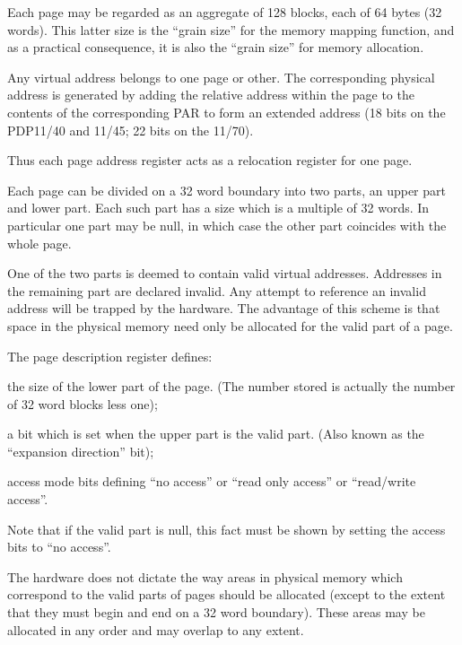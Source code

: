 Each page may be regarded as an aggregate
of 128 blocks, each of 64 bytes
(32 words). This latter size is the
``grain size'' for the memory mapping
function, and as a practical consequence,
it is also the ``grain size'' for
memory allocation.

Any virtual address belongs to one page
or other. The corresponding physical
address is generated by adding the
relative address within the page to the
contents of the corresponding PAR to
form an extended address (18 bits on
the PDP11/40 and 11/45; 22 bits on the
11/70).

Thus each page address register acts as
a relocation register for one page.

Each page can be divided on a 32 word
boundary into two parts, an upper part
and lower part. Each such part has a
size which is a multiple of 32 words.
In particular one part may be null, in
which case the other part coincides
with the whole page.

One of the two parts is deemed to contain
valid virtual addresses. Addresses
in the remaining part are declared
invalid. Any attempt to reference an
invalid address will be trapped by the
hardware. The advantage of this scheme
is that space in the physical memory
need only be allocated for the valid
part of a page.



The page description register defines:

\bd
\item[(a)] the size of the lower part of
the page. (The number stored is
actually the number of 32 word
blocks less one);

\item[(b)] a bit which is set when the
upper part is the valid part.
(Also known as the ``expansion
direction'' bit);

\item[(c)] access mode bits defining ``no
access'' or ``read only access'' or
``read/write access''.
\ed

Note that if the valid part is null,
this fact must be shown by setting the
access bits to ``no access''.


The hardware does not dictate the way
areas in physical memory which
correspond to the valid parts of pages
should be allocated (except to the
extent that they must begin and end on
a 32 word boundary). These areas may be
allocated in any order and may overlap
to any extent.

